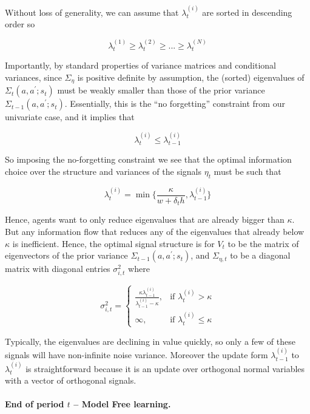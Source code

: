 \documentclass[12pt]{article}%
\begin{document}
\begin{itemize}
Without loss of generality, we can assume that $\lambda_{t}^{(i)}$ are sorted
in descending order so%

\[
\lambda_{t}^{(1)} \geq\lambda_{t}^{(2)} \geq... \geq\lambda_{t}^{(N)}
\]


Importantly, by standard properties of variance matrices and conditional
variances, since $\Sigma_{\eta}$ is positive definite by assumption, the
(sorted) eigenvalues of $\Sigma_{t}(a,a^{\prime}; s_{t})$ must be weakly
smaller than those of the prior variance $\Sigma_{t-1}(a,a^{\prime};s_{t})$.
Essentially, this is the ``no forgetting'' constraint from our univariate
case, and it implies that%

\[
\lambda_{t}^{(i)} \leq\lambda_{t-1}^{(i)}
\]


So imposing the no-forgetting constraint we see that the optimal information
choice over the structure and variances of the signals $\eta_{t}$ must be such that%

\[
\lambda_{t}^{(i)} = \min\{ \frac{\kappa}{w + \delta_{t} h}, \lambda
_{t-1}^{(i)} \}
\]


Hence, agents want to only reduce eigenvalues that are already bigger than
$\kappa$. But any information flow that reduces any of the eigenvalues that
already below $\kappa$ is inefficient. Hence, the optimal signal structure is
for $V_{t}$ to be the matrix of eigenvectors of the prior variance
$\Sigma_{t-1}(a,a^{\prime}; s_{t})$, and $\Sigma_{\eta,t}$ to be a diagonal
matrix with diagonal entries $\sigma_{i,t}^{2}$ where%

\[
\sigma_{i,t}^{2} =
\begin{cases}
\frac{\kappa\lambda_{t-1}^{(i)}}{ \lambda_{t-1}^{(i)} - \kappa}, & \text{if }
\lambda_{t}^{(i)} > \kappa\\
\infty, & \text{if } \lambda_{t}^{(i)} \leq\kappa
\end{cases}
\]


Typically, the eigenvalues are declining in value quickly, so only a few of
these signals will have non-infinite noise variance. Moreover the update form
$\lambda_{t-1}^{(i)}$ to $\lambda_{t}^{(i)}$ is straightforward because it is
an update over orthogonal normal variables with a vector of orthogonal signals.
\end{itemize}

\paragraph{ End of period $t$ -- Model Free learning.}
\end{document}
